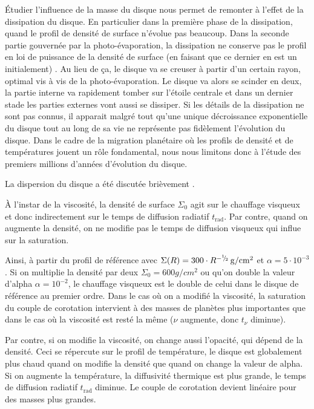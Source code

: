 Étudier l'influence de la masse du disque nous permet de remonter à l'effet de la dissipation du disque. En particulier dans la première phase de la dissipation, quand le profil de densité de surface n'évolue pas beaucoup. Dans la seconde partie gouvernée par la photo-évaporation, la dissipation ne conserve pas le profil en loi de puissance de la densité de surface (en faisant que ce dernier en est un initialement) . Au lieu de ça, le
disque va se creuser à partir d'un certain rayon, optimal vis à vis de la photo-évaporation. Le disque va alors se scinder en
deux, la partie interne va rapidement tomber sur l'étoile centrale et dans un dernier stade les parties externes vont aussi se
dissiper. Si les détails de la dissipation ne sont pas connus, il apparait malgré tout qu'une unique décroissance exponentielle du disque tout au long de sa vie ne représente pas fidèlement l'évolution du disque. Dans le cadre de la migration planétaire où les profils de densité et de températures jouent un rôle fondamental, nous nous limitons donc à l'étude des premiers millions d'années d'évolution du disque. 

La dispersion du disque a été discutée brièvement .

À l'instar de la viscosité, la densité de surface $\Sigma_0$ agit sur le chauffage visqueux et donc indirectement sur le temps de diffusion radiatif $t_\text{rad}$. Par contre, quand on augmente la densité, on ne modifie pas le temps de diffusion visqueux qui influe sur la saturation. 

Ainsi, à partir du profil de référence avec $\Sigma(R) = 300 \cdot
R^{-{{}^{1\!\!}/ _{\!2}}}\mathrm{\thinspace g/cm^2}$ et $\alpha=5\cdot 10^{-3}$. Si on multiplie la densité par deux $\Sigma_0=600\unit{g/cm^2}$ ou qu'on double la valeur d'alpha $\alpha=10^{-2}$, le chauffage visqueux est le double de celui dans le disque de référence au premier ordre. Dans le cas où on a modifié la viscosité, la saturation du couple de corotation intervient à des masses de planètes plus importantes que dans le cas où la viscosité est resté la même ($\nu$ augmente, donc $t_\nu$ diminue).  

Par contre, si on modifie la viscosité, on change aussi l'opacité, qui dépend de la densité. Ceci se répercute sur le profil de température, le disque est globalement plus chaud quand on modifie la densité que quand on change la valeur de alpha. Si on augmente la température, la diffusivité thermique est plus grande, le temps de diffusion radiatif $t_\text{rad}$ diminue. Le couple de corotation devient linéaire pour des masses plus grandes. 

